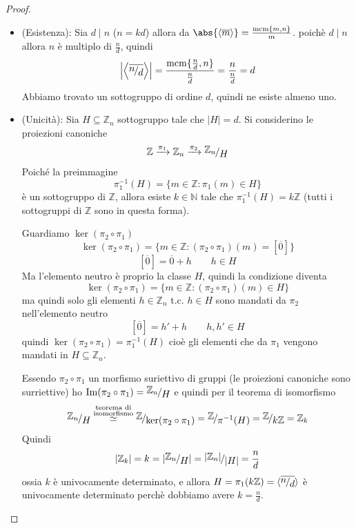 \documentclass[../main.tex]{subfiles}
\begin{document}
\begin{proof}\
    \begin{itemize}
        \item (Esistenza): Sia $d \mid n$ ($n = kd$) allora da $\abs{\langle \overline{m} \rangle} = \frac{\mcm \{{m,n}\}}{m}$. poichè $d \mid n$ allora $n$ è multiplo di $\frac{n}{d}$, quindi
              \[
                  \left|\left \langle \overline{\nicefrac{n}{d}}\right \rangle \right| = \frac{\mcm \{\frac{n}{d}, n\}}{\frac{n}{d}} = \frac{n}{\frac{n}{d}} = d
              \]
              Abbiamo trovato un sottogruppo di ordine $d$, quindi ne esiste almeno uno.
        \item (Unicità): Sia $H \subseteq \mathbb{Z}_n$ sottogruppo tale che $|H| = d$. Si considerino le proiezioni canoniche
              \[
                  \mathbb{Z} \xrightarrow{\pi_1} \mathbb{Z}_n \xrightarrow{\pi_2} \nicefrac{\mathbb{Z}_n }{H}
              \]
              Poiché la preimmagine
              \[
                  \pi^{-1}_1 (H) = \{m \in \mathbb{Z} : \pi_1 (m) \in H\}
              \]
              è un sottogruppo di $\mathbb{Z}$, allora esiste $k \in \mathbb{N} $ tale che $\pi^{-1}_1(H) = k \mathbb{Z}$ (tutti i sottogruppi di $\mathbb{Z}$ sono in questa forma).

              Guardiamo $\ker(\pi_2 \circ \pi_1)$
              \[
                  \ker(\pi_2 \circ \pi_1) = \{m \in \mathbb{Z} : (\pi_2 \circ \pi_1)(m) = [\overline{0}]\}
              \]
              \[
                  [\overline{0}] = \overline{0} + h \qquad  h \in H
              \]
              Ma l'elemento neutro è proprio la classe $H$, quindi la condizione diventa
              \[
                  \ker(\pi_2 \circ \pi_1) = \{m \in \mathbb{Z} : (\pi_2 \circ \pi_1)(m) \in H \}
              \]
              ma quindi solo gli elementi $h \in \mathbb{Z}_n$ t.c. $h \in H$ sono mandati da $\pi_2$ nell'elemento neutro
              \[
                  [\overline{0}] = h' + h \qquad  h,h' \in H
              \]
              quindi $\ker(\pi_2 \circ \pi_1) = \pi^{-1}_1 (H)$ cioè gli elementi che da $\pi_1$ vengono mandati in $H \subseteq \mathbb{Z}_n$.

              Essendo $\pi_2 \circ \pi_1$ un morfismo suriettivo di gruppi (le proiezioni canoniche sono surriettive) ho $\Im(\pi_2 \circ \pi_1) = \nicefrac{\mathbb{Z}_n }{H}$ e quindi per il teorema di isomorfismo
              \[
                  \nicefrac{\mathbb{Z}_n }{H} \overset{\substack{\text{teorema di}\\\text{isomorfismo}}}{\simeq} \nicefrac{\mathbb{Z}}{\ker(\pi_2 \circ \pi_1)} = \nicefrac{\mathbb{Z} }{\pi^{-1}(H)} = \nicefrac{\mathbb{Z} }{k \mathbb{Z} }= \mathbb{Z}_k
              \]
              Quindi
              \[
                  |\mathbb{Z}_k| = k =|\nicefrac{\mathbb{Z}_n }{H}| = \nicefrac{|\mathbb{Z}_n |}{|H|} = \frac{n}{d}
              \]
              ossia $k$ è univocamente determinato, e allora $H = \pi_1 (k \mathbb{Z} ) = \langle \overline{\nicefrac{n}{d}} \rangle$ è univocamente determinato perchè dobbiamo avere $k = \frac{n}{d}$.
    \end{itemize}
\end{proof}
\end{document}
